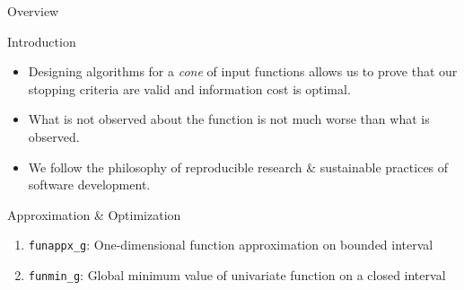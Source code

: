 \documentclass[final]{beamer}
\newlength{\onecolwid}
\begin{document}
\begin{frame}[t]
\begin{columns}[t]
\begin{column}{\onecolwid}
\begin{alertblock}{Overview}
\end{alertblock}


\begin{block}{Introduction}
\begin{itemize}
\item Designing algorithms for a \emph{cone} of input functions allows us to prove that our stopping criteria are valid and information cost is optimal.

\item What is not observed about the function is not much worse than what is observed.
    \item  We follow the philosophy  of  reproducible  research \& sustainable practices of  software development.
\end{itemize}
\end{block}



\begin{block}{Approximation \& Optimization}

\begin{enumerate}\setlength\itemsep{1em}
\item \texttt{funappx\_g}: One-dimensional function approximation on bounded interval \cite{FunappxFunmin}
\item \texttt{funmin\_g}: Global minimum value of univariate function on a closed interval \cite{FunappxFunmin}
\end{enumerate}
\end{block}



\end{column}
\end{columns}
\end{frame}
\end{document}
